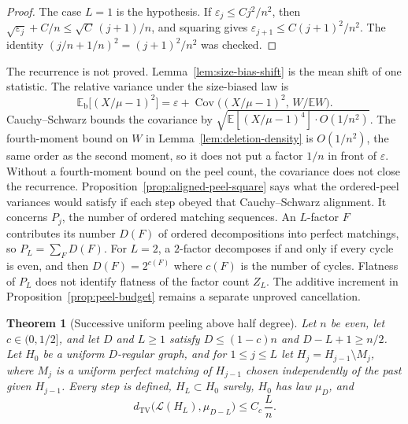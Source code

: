 \documentclass[11pt]{article}
\newtheorem{theorem}{Theorem}
\newcommand{\EE}{\mathbb{E}}
\newcommand{\dTV}{d_{\mathrm{TV}}}
\begin{document}
\begin{proof}
The case \(L=1\) is the hypothesis.
If \(\varepsilon_j\le C j^2/n^2\), then
\(\sqrt{\varepsilon_j}+C/n\le \sqrt{C}\,(j+1)/n\),
and squaring gives \(\varepsilon_{j+1}\le C(j+1)^2/n^2\).
The identity \((j/n+1/n)^2=(j+1)^2/n^2\) was checked.
\end{proof}

The recurrence is not proved. Lemma~\ref{lem:size-bias-shift} is the mean
shift of one statistic. The relative variance under the size-biased law is
\[
\EE_{\mathrm{b}}\bigl[(X/\mu-1)^2\bigr]
=
\varepsilon
+
\operatorname{Cov}\bigl((X/\mu-1)^2,\,W/\EE W\bigr).
\]
Cauchy--Schwarz bounds the covariance by
\(\sqrt{\EE[(X/\mu-1)^4]\cdot O(1/n^2)}\).
The fourth-moment bound on \(W\) in Lemma~\ref{lem:deletion-density} is
\(O(1/n^2)\), the same order as the second moment, so it does not put a factor
\(1/n\) in front of \(\varepsilon\).
Without a fourth-moment bound on the peel count, the covariance does not
close the recurrence.
Proposition~\ref{prop:aligned-peel-square} says
what the ordered-peel variances would satisfy if each step obeyed that
Cauchy--Schwarz alignment.
It concerns \(P_j\), the number of ordered matching sequences.
An \(L\)-factor \(F\) contributes its number \(D(F)\) of ordered decompositions
into perfect matchings, so \(P_L=\sum_F D(F)\).
For \(L=2\), a \(2\)-factor decomposes if and only if every cycle is even, and
then \(D(F)=2^{c(F)}\) where \(c(F)\) is the number of cycles.
Flatness of \(P_L\) does not identify flatness of the factor count \(Z_L\).
The additive increment in Proposition~\ref{prop:peel-budget} remains a
separate unproved cancellation.

\begin{theorem}[Successive uniform peeling above half degree]
\label{thm:successive-peel}
Let \(n\) be even, let \(c\in(0,1/2]\), and let \(D\) and \(L\ge 1\) satisfy
\(D\le(1-c)n\) and \(D-L+1\ge n/2\).
Let \(H_0\) be a uniform \(D\)-regular graph, and for \(1\le j\le L\) let
\(H_j=H_{j-1}\setminus M_j\), where \(M_j\) is a uniform perfect matching of
\(H_{j-1}\) chosen independently of the past given \(H_{j-1}\).
Every step is defined, \(H_L\subset H_0\) surely, \(H_0\) has law \(\mu_D\), and
\[
\dTV\bigl(\mathcal L(H_L),\mu_{D-L}\bigr)\le C_c\,\frac{L}{n}.
\]
\end{theorem}
\end{document}
